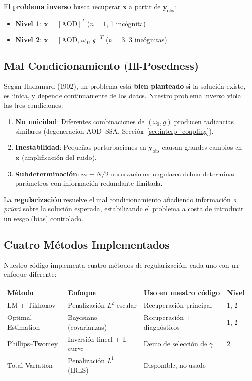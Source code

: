 \documentclass[a4paper,11pt]{article}
\begin{document}
El \textbf{problema inverso} busca recuperar $\mathbf{x}$ a partir de
$\mathbf{y}_{\text{obs}}$:
\begin{itemize}
    \item \textbf{Nivel 1}: $\mathbf{x} = [\text{AOD}]^T$ ($n=1$, 1 inc\'ognita)
    \item \textbf{Nivel 2}: $\mathbf{x} = [\text{AOD},\,\omega_0,\,g]^T$
          ($n=3$, 3 inc\'ognitas)
\end{itemize}

\subsection{Mal Condicionamiento (Ill-Posedness)}

Seg\'un Hadamard (1902), un problema est\'a \textbf{bien planteado} si la
soluci\'on existe, es \'unica, y depende continuamente de los datos.
Nuestro problema inverso viola las tres condiciones:
\begin{enumerate}
    \item \textbf{No unicidad}: Diferentes combinaciones de $(\omega_0, g)$
          producen radiancias similares (degeneraci\'on AOD--SSA,
          Secci\'on~\ref{sec:interp_coupling}).
    \item \textbf{Inestabilidad}: Peque\~nas perturbaciones en
          $\mathbf{y}_{\text{obs}}$ causan grandes cambios en $\mathbf{x}$
          (amplificaci\'on del ruido).
    \item \textbf{Subdeterminaci\'on}: $m = N/2$ observaciones angulares deben
          determinar par\'ametros con informaci\'on redundante limitada.
\end{enumerate}

La \textbf{regularizaci\'on} resuelve el mal condicionamiento a\~nadiendo
informaci\'on \emph{a priori} sobre la soluci\'on esperada, estabilizando el
problema a costa de introducir un sesgo (bias) controlado.

\subsection{Cuatro M\'etodos Implementados}

Nuestro c\'odigo implementa cuatro m\'etodos de regularizaci\'on, cada uno
con un enfoque diferente:
\begin{center}
\small
\begin{tabular}{@{}lp{4cm}p{4cm}l@{}}
\toprule
\textbf{M\'etodo} & \textbf{Enfoque} & \textbf{Uso en nuestro c\'odigo}
& \textbf{Nivel} \\ \midrule
LM + Tikhonov & Penalizaci\'on $L^2$ escalar & Recuperaci\'on principal
& 1, 2 \\
Optimal Estimation & Bayesiano (covarianzas) & Recuperaci\'on + diagn\'osticos
& 1, 2 \\
Phillips--Twomey & Inversi\'on lineal + L-curve & Demo de selecci\'on de $\gamma$
& 2 \\
Total Variation & Penalizaci\'on $L^1$ (IRLS) & Disponible, no usado
& --- \\
\bottomrule
\end{tabular}
\end{center}
\end{document}

